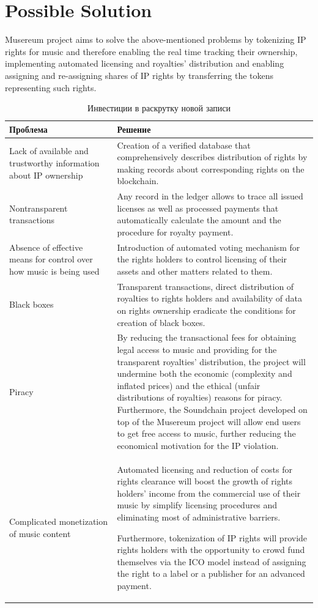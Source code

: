 \documentclass[12pt]{report}
\begin{document}
\section{Possible Solution}
\label{industry-solution}
Musereum project aims to solve the above-mentioned problems by tokenizing IP rights for music and therefore enabling the real time tracking their ownership, implementing automated licensing and royalties’ distribution and enabling assigning and re-assigning shares of IP rights by transferring the tokens representing such rights.

\begin{table}[H]
\centering
\caption{Инвестиции в раскрутку новой записи}
\begin{tabular}{p{0.35\linewidth}p{0.65\linewidth}}
\toprule
Проблема & Решение \\
\bottomrule
\midrule
Lack of available and trustworthy information about IP ownership & 
Creation of a verified database that comprehensively describes distribution of rights by making records about corresponding rights on the blockchain. \\
\hline
Nontransparent transactions & 
Any record in the ledger allows to trace all issued licenses as well as processed payments that automatically calculate the amount and the procedure for royalty payment. \\
\hline
Absence of effective means for control over how music is being used &
Introduction of automated voting mechanism for the rights holders to control licensing of their assets and other matters related to them. \\
\hline
Black boxes & 
Transparent transactions, direct distribution of royalties to rights holders and availability of data on rights ownership eradicate the conditions for creation of black boxes. \\
\hline
Piracy &
By reducing the transactional fees for obtaining legal access to music and providing for the transparent royalties’ distribution, the project will undermine both the economic (complexity and inflated prices) and the ethical (unfair distributions of royalties) reasons for piracy. Furthermore, the Soundchain project developed on top of the Musereum project will allow end users to get free access to music, further reducing the economical motivation for the IP violation. \\
\hline
Complicated monetization of music content &
Automated licensing and reduction of costs for rights clearance will boost the growth of rights holders' income from the commercial use of their music by simplify licensing procedures and eliminating most of administrative barriers.

Furthermore, tokenization of IP rights will provide rights holders with the opportunity to crowd fund themselves via the ICO model instead of assigning the right to a label or a publisher for an advanced payment. \\
\bottomrule
\end{tabular}
\end{table}
\end{document}
